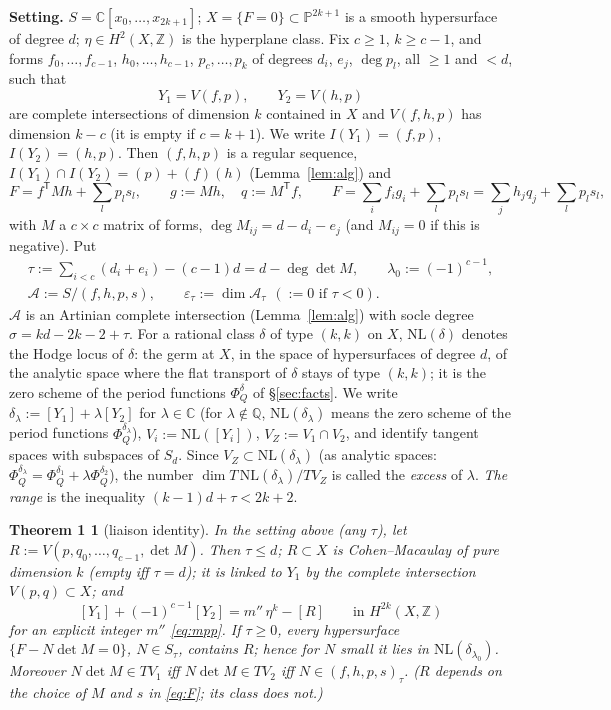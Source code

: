 \documentclass[11pt]{article}
\numberwithin{equation}{section}
\newtheorem*{thm1}{Theorem 1}
\theoremstyle{remark}
\newcommand{\PP}{\mathbb{P}}
\newcommand{\CC}{\mathbb{C}}
\newcommand{\QQ}{\mathbb{Q}}
\newcommand{\ZZ}{\mathbb{Z}}
\newcommand{\NL}{\mathrm{NL}}
\newcommand{\VZ}{V_Z}
\newcommand{\cA}{\mathcal{A}}
\newcommand{\T}{\mathsf{T}}
\newcommand{\lz}{\lambda_0}
\newcommand{\et}{\varepsilon_\tau}
\newcommand{\run}[1]{\medskip\noindent\textbf{#1}}
\begin{document}
\run{Setting.} $S=\CC[x_0,\dots,x_{2k+1}]$; $X=\{F=0\}\subset\PP^{2k+1}$ is a smooth hypersurface of degree $d$;
$\eta\in H^2(X,\ZZ)$ is the hyperplane class. Fix $c\ge1$, $k\ge c-1$, and forms
$f_0,\dots,f_{c-1}$, $h_0,\dots,h_{c-1}$, $p_c,\dots,p_k$ of degrees $d_i$, $e_j$, $\deg p_l$, all $\ge1$ and $<d$,
such that
\[
Y_1=V(f,p),\qquad Y_2=V(h,p)
\]
are complete intersections of dimension $k$ contained in $X$ and $V(f,h,p)$ has dimension $k-c$ (it is empty if
$c=k+1$). We write $I(Y_1)=(f,p)$, $I(Y_2)=(h,p)$. Then $(f,h,p)$ is a regular sequence,
$I(Y_1)\cap I(Y_2)=(p)+(f)(h)$ (Lemma~\ref{lem:alg}) and
\begin{equation}\label{eq:F}
F=f^\T Mh+\sum_l p_ls_l,\qquad g:=Mh,\quad q:=M^\T f,\qquad F=\sum_i f_ig_i+\sum_l p_ls_l=\sum_j h_jq_j+\sum_l p_ls_l,
\end{equation}
with $M$ a $c\times c$ matrix of forms, $\deg M_{ij}=d-d_i-e_j$ (and $M_{ij}=0$ if this is negative). Put
\begin{gather*}
\tau:=\sum_{i<c}(d_i+e_i)-(c-1)d=d-\deg\det M,\qquad \lz:=(-1)^{c-1},\\
\cA:=S/(f,h,p,s),\qquad \et:=\dim \cA_\tau\ \ (:=0\text{ if }\tau<0).
\end{gather*}
$\cA$ is an Artinian complete intersection (Lemma~\ref{lem:alg}) with socle degree
$\sigma=kd-2k-2+\tau$. For a rational class $\delta$ of type $(k,k)$ on $X$, $\NL(\delta)$ denotes the Hodge
locus of $\delta$: the germ at $X$, in the space of hypersurfaces of degree $d$, of the analytic space where the
flat transport of $\delta$ stays of type $(k,k)$; it is the zero scheme of the period functions $\Phi^\delta_Q$
of \S\ref{sec:facts}. We write $\delta_\lambda:=[Y_1]+\lambda[Y_2]$ for $\lambda\in\CC$ (for $\lambda\notin\QQ$, $\NL(\delta_\lambda)$ means
the zero scheme of the period functions $\Phi^{\delta_\lambda}_Q$), $V_i:=\NL([Y_i])$, $\VZ:=V_1\cap V_2$, and
identify tangent spaces with subspaces of $S_d$. Since $\VZ\subset\NL(\delta_\lambda)$ (as analytic spaces:
$\Phi^{\delta_\lambda}_Q=\Phi^{\delta_1}_Q+\lambda\Phi^{\delta_2}_Q$), the number
$\dim T\,\NL(\delta_\lambda)/T\VZ$ is called the \emph{excess} of $\lambda$. \emph{The range} is the inequality
$(k-1)d+\tau<2k+2$.

\begin{thm1}[liaison identity]
In the setting above (any $\tau$), let $R:=V(p,q_0,\dots,q_{c-1},\det M)$. Then $\tau\le d$; $R\subset X$ is
Cohen--Macaulay of pure dimension $k$ (empty iff $\tau=d$); it is linked to $Y_1$ by the complete intersection
$V(p,q)\subset X$; and
\[
[Y_1]+(-1)^{c-1}[Y_2]=m''\,\eta^k-[R]\qquad\text{in }H^{2k}(X,\ZZ)
\]
for an explicit integer $m''$ \eqref{eq:mpp}. If $\tau\ge0$, every hypersurface $\{F-N\det M=0\}$, $N\in S_\tau$,
contains $R$; hence for $N$ small it lies in $\NL(\delta_{\lz})$. Moreover $N\det M\in T V_1$ iff
$N\det M\in TV_2$ iff $N\in(f,h,p,s)_\tau$. ($R$ depends on the choice of $M$ and $s$ in \eqref{eq:F}; its class
does not.)
\end{thm1}
\end{document}
